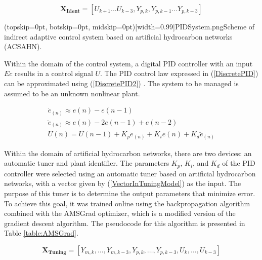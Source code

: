 \documentclass{ieeeaccess}
\begin{document}
\begin{equation}\label{VectorInIdentModel}
 \mathbf{X_{Ident}}=[U_{k+1}...U_{k-3},Y_{p,k},Y_{p,k-1}...Y_{p,k-3}]
\end{equation}

\Figure[ht!](topskip=0pt, botskip=0pt, midskip=0pt)[width=0.99\columnwidth]{PIDSystem.png}{Scheme of indirect adaptive control system based on artificial hydrocarbon networks (ACSAHN)\label{fig:PIDSystem}.}

Within the domain of the control system, a digital PID controller with an input \(Ec\) results in a control signal \(U\). The PID control law expressed in (\ref{DiscretePID}) can be approximated using (\ref{DiscretePID2}) \cite{hernandez-alvarado_neural_2016}. The system to be managed is assumed to be an unknown nonlinear plant.

\begin{equation}\label{DiscretePID2}
 \begin{matrix}
 {\dot{e}}_{(n)} \approx e\left(n\right)-e\left(n-1\right)\\
 {\ddot{e}}_{(n)} \approx e\left(n\right)-2e\left(n-1\right)+e\left(n-2\right)\\
 U\left(n\right)=U\left(n-1\right)+K_p{\dot{e}}_{(n)} + K_i e\left(n\right) + K_d{\ddot{e}}_{(n)}
 \end{matrix}
\end{equation}

Within the domain of artificial hydrocarbon networks, there are two devices: an automatic tuner and plant identifier. The parameters \(K_p\), \(K_i\), and \(K_d\) of the PID controller were selected using an automatic tuner based on artificial hydrocarbon networks, with a vector given by (\ref{VectorInTuningModel}) as the input. The purpose of this tuner is to determine the output parameters that minimize error. To achieve this goal, it was trained online using the backpropagation algorithm combined with the AMSGrad optimizer, which is a modified version of the gradient descent algorithm. The pseudocode for this algorithm is presented in Table \ref{table:AMSGrad}.

\begin{equation}\label{VectorInTuningModel}
    \mathbf{X_{Tuning}}=[Y_{m,k},\dots,Y_{m ,k-3},Y_{p,k},\dots,Y_{p,k-3},U_k,\dots,U_{k-3}]
\end{equation}
\end{document}
